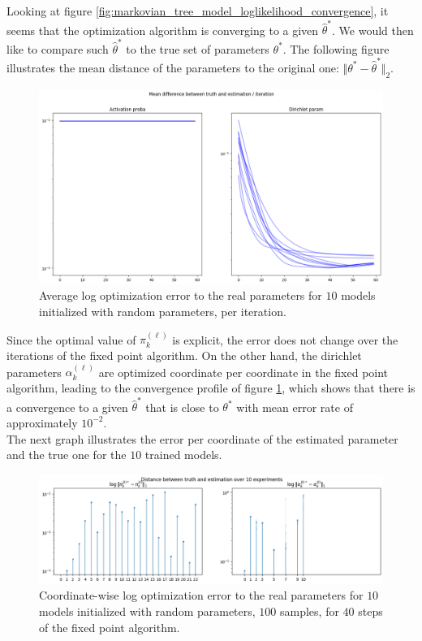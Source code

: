 Looking at figure \ref{fig:markovian_tree_model_loglikelihood_convergence}, it seems that the optimization algorithm is converging to a given $\widehat{\theta}^*$.
We would then like to compare such $\widehat{\theta}^*$ to the true set of parameters $\theta^*$.
The following figure illustrates the mean distance of the parameters to the original one: $\Vert \theta^* - \widehat{\theta}^* \Vert_2$.
\begin{figure}[H]
    \centering
    \includegraphics[scale=0.35]{images/markovian_tree_model_convergence_error_estimators_iteration}
    \caption{Average log optimization error to the real parameters for $10$ models initialized with random parameters, per iteration.}
    \label{fig:markovian_tree_model_error_convergence}
\end{figure}

Since the optimal value of $\pi_k^{(\ell)}$ is explicit, the error does not change over the iterations of the fixed point algorithm.
On the other hand, the dirichlet parameters $\alpha_k^{(\ell)}$ are optimized coordinate per coordinate in the fixed point algorithm,
leading to the convergence profile of figure \ref{fig:markovian_tree_model_error_convergence}, which shows that there is a convergence to
a given $\widehat{\theta}^*$ that is close to $\theta^*$ with mean error rate of approximately $10^{-2}$. \\

The next graph illustrates the error per coordinate of the estimated parameter and the true one for the $10$ trained models.
\begin{figure}[H]
    \centering
    \includegraphics[scale=0.6]{images/markovian_tree_model_error_estimators}
    \caption{Coordinate-wise log optimization error to the real parameters for $10$ models initialized with random parameters, $100$ samples, for $40$ steps of the fixed point algorithm.}
    \label{fig:markovian_tree_model_error_estimations}
\end{figure}

